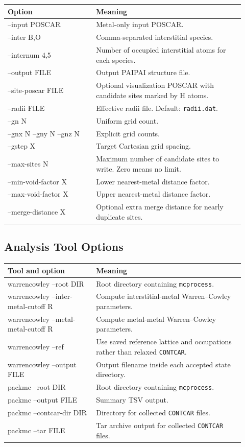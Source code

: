 \documentclass[11pt]{article}
\newcommand{\PAIPAI}{\textsc{PAIPAI}}
\begin{document}
\begin{longtable}{>{\ttfamily}p{0.34\linewidth}p{0.58\linewidth}}
\toprule
Option & Meaning \\
\midrule
\endhead
--input POSCAR & Metal-only input POSCAR. \\
--inter B,O & Comma-separated interstitial species. \\
--internum 4,5 & Number of occupied interstitial atoms for each species. \\
--output FILE & Output \PAIPAI{} structure file. \\
--site-poscar FILE & Optional visualization POSCAR with candidate sites marked by H atoms. \\
--radii FILE & Effective radii file. Default: \texttt{radii.dat}. \\
--gn N & Uniform grid count. \\
--gnx N --gny N --gnz N & Explicit grid counts. \\
--gstep X & Target Cartesian grid spacing. \\
--max-sites N & Maximum number of candidate sites to write. Zero means no limit. \\
--min-void-factor X & Lower nearest-metal distance factor. \\
--max-void-factor X & Upper nearest-metal distance factor. \\
--merge-distance X & Optional extra merge distance for nearly duplicate sites. \\
\bottomrule
\end{longtable}

\subsection{Analysis Tool Options}

\begin{longtable}{>{\ttfamily}p{0.34\linewidth}p{0.58\linewidth}}
\toprule
Tool and option & Meaning \\
\midrule
\endhead
warrencowley --root DIR & Root directory containing \texttt{mcprocess}. \\
warrencowley --inter-metal-cutoff R & Compute interstitial-metal Warren--Cowley parameters. \\
warrencowley --metal-metal-cutoff R & Compute metal-metal Warren--Cowley parameters. \\
warrencowley --ref & Use saved reference lattice and occupations rather than relaxed \texttt{CONTCAR}. \\
warrencowley --output FILE & Output filename inside each accepted state directory. \\
packmc --root DIR & Root directory containing \texttt{mcprocess}. \\
packmc --output FILE & Summary TSV output. \\
packmc --contcar-dir DIR & Directory for collected \texttt{CONTCAR} files. \\
packmc --tar FILE & Tar archive output for collected \texttt{CONTCAR} files. \\
\bottomrule
\end{longtable}
\end{document}
